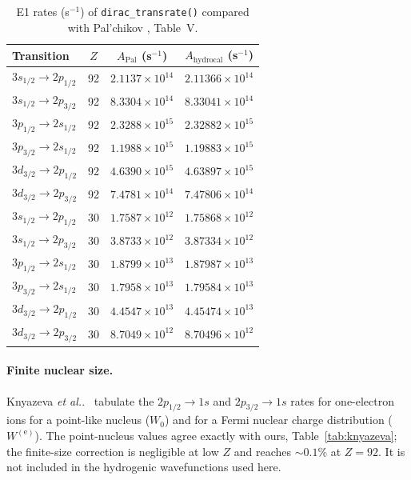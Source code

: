 \documentclass[11pt,a4paper]{article}
\begin{document}
\begin{table}[h]
\centering
\begin{tabular}{lccc}
\hline
Transition & $Z$ & $A_{\text{Pal}}$ (s${}^{-1}$) & $A_{\text{hydrocal}}$ (s${}^{-1}$) \\
\hline
$3s_{1/2}\to2p_{1/2}$ & 92 & $2.1137\times10^{14}$ & $2.11366\times10^{14}$ \\
$3s_{1/2}\to2p_{3/2}$ & 92 & $8.3304\times10^{14}$ & $8.33041\times10^{14}$ \\
$3p_{1/2}\to2s_{1/2}$ & 92 & $2.3288\times10^{15}$ & $2.32882\times10^{15}$ \\
$3p_{3/2}\to2s_{1/2}$ & 92 & $1.1988\times10^{15}$ & $1.19883\times10^{15}$ \\
$3d_{3/2}\to2p_{1/2}$ & 92 & $4.6390\times10^{15}$ & $4.63897\times10^{15}$ \\
$3d_{3/2}\to2p_{3/2}$ & 92 & $7.4781\times10^{14}$ & $7.47806\times10^{14}$ \\
$3s_{1/2}\to2p_{1/2}$ & 30 & $1.7587\times10^{12}$ & $1.75868\times10^{12}$ \\
$3s_{1/2}\to2p_{3/2}$ & 30 & $3.8733\times10^{12}$ & $3.87334\times10^{12}$ \\
$3p_{1/2}\to2s_{1/2}$ & 30 & $1.8799\times10^{13}$ & $1.87987\times10^{13}$ \\
$3p_{3/2}\to2s_{1/2}$ & 30 & $1.7958\times10^{13}$ & $1.79584\times10^{13}$ \\
$3d_{3/2}\to2p_{1/2}$ & 30 & $4.4547\times10^{13}$ & $4.45474\times10^{13}$ \\
$3d_{3/2}\to2p_{3/2}$ & 30 & $8.7049\times10^{12}$ & $8.70496\times10^{12}$ \\
\hline
\end{tabular}
\caption{E1 rates (s${}^{-1}$) of {\tt dirac\_transrate()} compared with
Pal'chikov \cite{Palchikov1998}, Table~V.}
\label{tab:palch}
\end{table}

\paragraph{Finite nuclear size.}
Knyazeva \emph{et al.}.~\cite{Knyazeva2022} tabulate the
$2p_{1/2}\to1s$ and $2p_{3/2}\to1s$ rates for one-electron ions for a
point-like nucleus ($W_{0}$) and for a Fermi nuclear charge distribution
($W^{(\mathrm e)}$).  The point-nucleus values agree exactly with ours,
Table~\ref{tab:knyazeva}; the finite-size correction is negligible at
low $Z$ and reaches $\sim0.1\%$ at $Z=92$.  It is not included in the
hydrogenic wavefunctions used here.
\end{document}
